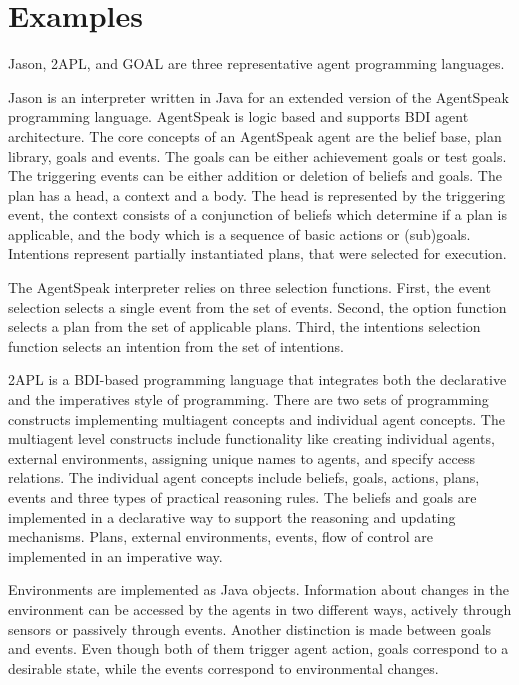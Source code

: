 \documentclass[a4paper,12pt,oneside,fleqn]{book} %
\theoremstyle{plain}
\theoremstyle{definition}
\theoremstyle{remark}
\begin{document}
\section{Examples} %
Jason, 2APL, and GOAL are three representative agent programming languages.

Jason is an interpreter written in Java for an extended version of the
AgentSpeak programming language. AgentSpeak is logic based and supports BDI
agent architecture. The core concepts of an AgentSpeak agent are the belief
base, plan library, goals and events. The goals can be either achievement
goals or test goals. The triggering events can be either addition or
deletion of beliefs and goals. The plan has a head, a context and a body.
The head is represented by the triggering event, the context consists of a
conjunction of beliefs which determine if a plan is applicable, and the
body which is a sequence of basic actions or (sub)goals. Intentions
represent partially instantiated plans, that were selected for execution. 

The AgentSpeak interpreter relies on three selection functions. First, the
event selection selects a single event from the set of events. Second, the
option function selects a plan from the set of applicable plans. Third, the
intentions selection function selects an intention from the set of
intentions. 

2APL is a BDI-based programming language that integrates both the
declarative and the imperatives style of programming. There are two sets of
programming constructs implementing multiagent concepts and individual
agent concepts. The multiagent level constructs include functionality like 
creating individual agents, external environments, assigning unique names
to agents, and specify access relations. The individual agent concepts
include beliefs, goals, actions, plans, events and three types of practical
reasoning rules. The beliefs and goals are implemented in a declarative way
to support the reasoning and updating mechanisms. Plans, external
environments, events, flow of control are implemented in an imperative way.

Environments are implemented as Java objects. Information about changes in
the environment can be accessed by the agents in two different ways,
actively through sensors or passively through events. Another distinction
is made between goals and events. Even though both of them trigger agent
action, goals correspond to a desirable state, while the events correspond
to environmental changes.
\end{document}
